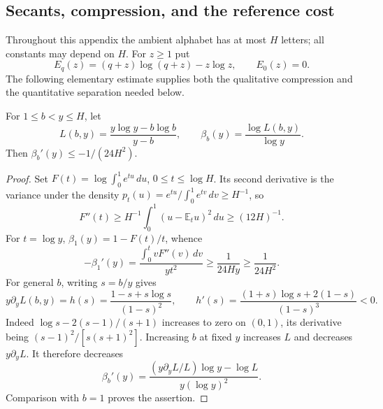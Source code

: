 \subsection{Secants, compression, and the reference cost}
\label{paper:ep-reference}
Throughout this appendix the ambient alphabet has at most $H$ letters;
all constants may depend on $H$.  For $z\geq1$ put
\[
 E_q(z)=(q+z)\log(q+z)-z\log z,\qquad E_0(z)=0.
\]
The following elementary estimate supplies both the qualitative
compression and the quantitative separation needed below.
\begin{lemma}\label{paper:ep-secants}
For $1\leq b<y\leq H$, let
\[
 L(b,y)=\frac{y\log y-b\log b}{y-b},\qquad
 \beta_b(y)=\frac{\log L(b,y)}{\log y}.
\]
Then $\beta_b'(y)\leq-1/(24H^2)$.
\end{lemma}
\begin{proof}
Set $F(t)=\log\int_0^1e^{tu}\,du$, $0\leq t\leq\log H$.
Its second derivative is the variance under the density
$p_t(u)=e^{tu}/\int_0^1e^{tv}\,dv\geq H^{-1}$, so
\[
 F''(t)\geq H^{-1}\int_0^1(u-\mathbb E_tu)^2\,du\geq(12H)^{-1}.
\]
For $t=\log y$, $\beta_1(y)=1-F(t)/t$, whence
\[
 -\beta_1'(y)=\frac{\int_0^t vF''(v)\,dv}{yt^2}
 \geq\frac1{24Hy}\geq\frac1{24H^2}.
\]
For general $b$, writing $s=b/y$ gives
\[
 y\partial_yL(b,y)=h(s)=\frac{1-s+s\log s}{(1-s)^2},\qquad
 h'(s)=\frac{(1+s)\log s+2(1-s)}{(1-s)^3}<0.
\]
Indeed $\log s-2(s-1)/(s+1)$ increases to zero on $(0,1)$,
its derivative being $(s-1)^2/[s(s+1)^2]$.  Increasing $b$ at fixed
$y$ increases $L$ and decreases $y\partial_yL$.  It therefore decreases
\[
 \beta_b'(y)=\frac{(y\partial_yL/L)\log y-\log L}
                   {y(\log y)^2}.
\]
Comparison with $b=1$ proves the assertion.
\end{proof}

